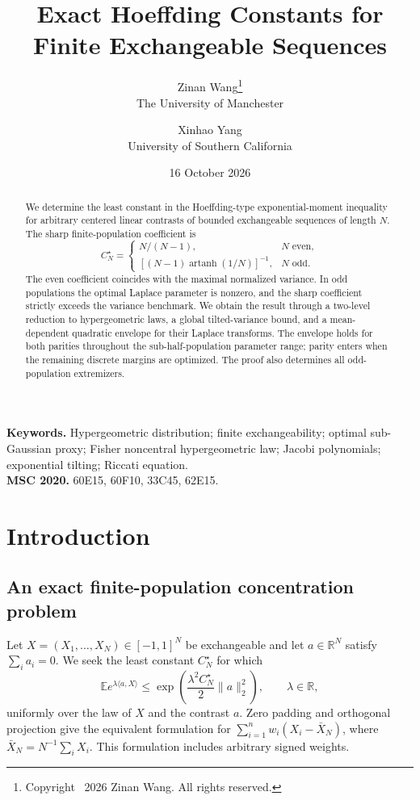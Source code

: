 \documentclass[11pt,a4paper]{article}
\title{\bfseries Exact Hoeffding Constants for Finite Exchangeable Sequences}
\author{Zinan Wang\thanks{Copyright \textcopyright\ 2026 Zinan Wang. All rights reserved.}\\{\small The University of Manchester}\and Xinhao Yang\\{\small University of Southern California}}
\date{16 October 2026}
\newcommand{\E}{\mathbb E}\newcommand{\R}{\mathbb R}\newcommand{\N}{\mathbb N}\newcommand{\one}{\mathbf1}
\begin{document}
\maketitle
\begin{abstract}
We determine the least constant in the Hoeffding-type exponential-moment inequality for arbitrary centered linear contrasts of bounded exchangeable sequences of length $N$. The sharp finite-population coefficient is
\[
 C_N^\star=\begin{cases}
 \displaystyle N/(N-1),&N\text{ even},\\[3pt]
 \displaystyle[(N-1)\operatorname{artanh}(1/N)]^{-1},&N\text{ odd}.
 \end{cases}
\]
The even coefficient coincides with the maximal normalized variance. In odd populations the optimal Laplace parameter is nonzero, and the sharp coefficient strictly exceeds the variance benchmark. We obtain the result through a two-level reduction to hypergeometric laws, a global tilted-variance bound, and a mean-dependent quadratic envelope for their Laplace transforms. The envelope holds for both parities throughout the sub-half-population parameter range; parity enters when the remaining discrete margins are optimized. The proof also determines all odd-population extremizers.
\end{abstract}
\noindent\textbf{Keywords.} Hypergeometric distribution; finite exchangeability; optimal sub-Gaussian proxy; Fisher noncentral hypergeometric law; Jacobi polynomials; exponential tilting; Riccati equation.\\
\textbf{MSC 2020.} 60E15, 60F10, 33C45, 62E15.
\section{Introduction}
\subsection{An exact finite-population concentration problem}
Let $X=(X_1,\ldots,X_N)\in[-1,1]^N$ be exchangeable and let $a\in\R^N$ satisfy $\sum_i a_i=0$. We seek the least constant $C_N^\star$ for which
\begin{equation}\label{eq:exchange-intro}
 \E e^{\lambda\langle a,X\rangle}
 \le\exp\left(\frac{\lambda^2C_N^\star}{2}\|a\|_2^2\right),
 \qquad \lambda\in\R,
\end{equation}
uniformly over the law of $X$ and the contrast $a$. Zero padding and orthogonal projection give the equivalent formulation for $\sum_{i=1}^n w_i(X_i-\bar X_N)$, where $\bar X_N=N^{-1}\sum_iX_i$. This formulation includes arbitrary signed weights.
\end{document}
